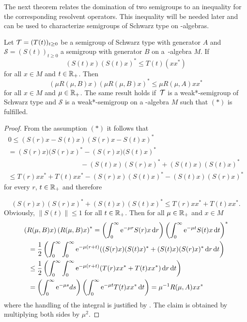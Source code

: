 The next theorem relates the domination of two semigroups to an inequality for the corresponding resolvent operators.
This inequality will be needed later and can be used to characterize semigroups of Schwarz type on \CA-algebras.
\begin{theorem}\label{thm:d1-2.1}
Let $  \TT  = (T(t))_{t\geq0} $ be a semigroup of Schwarz type with generator $ A $ and $ \mathcal{S} = (S(t))_{t\geq0} $ a semigroup with generator $ B $ on a\, \CA-algebra $ M $.
If
\begin{equation}
	(S(t)x)(S(t)x)^{*} \leq T(t)(xx^{*}) \tag{*}
\end{equation}
for all $ x \in M $ and $ t \in \mathbb{R}_{+} $.
Then  
\[
	\left( \mu R(\mu,B)x \right) \left( \mu R(\mu,B)x \right)^{*} \leq \mu R(\mu,A)xx^{*}
\]
for all $ x \in M $ and $ \mu \in \mathbb{R}_{+} $.
The same result holds if\/ $ \,\mathcal{T} $ is a weak*-semigroup of Schwarz type and $ \mathcal{S} $ is a weak*-semigroup on a \WA-algebra $ M $ such that $ (*) $ is fulfilled.
\end{theorem}
\begin{proof}
From the assumption $ (*) $ it follows that
\begin{multline*}
	0 	 \leq \left( S(r)x - S(t)x \right) \left( S(r)x - S(t)x \right)^{*} {} \\
		  = \left( S(r)x)(S(r)x \right)^{*} - \left( S(r)x)(S(t)x \right)^{*} \\
		 \phantom{(S(r)x)(S(r)x)^{*}} - (S(t)x)(S(r)x)^{*} + (S(t)x)(S(t)x)^{*}  \\
		\leq T(r)xx^{*} + T(t)xx^{*}   - (S(r)x)(S(t)x)^{*} -  
		   (S(t)x)(S(r)x)^{*}
\end{multline*}
for every $ r $, $ t \in \mathbb{R}_{+} $ and therefore

\[
	(S(r)x)(S(r)x)^{*} + (S(t)x)(S(t)x)^{*} \leq T(r)xx^{*} + T(t)xx^{*} .
\]
Obviously, $ \| S(t)\| \leq 1 $ for all $ t \in \mathbb{R}_{+} $.
Then for all $ \mu \in \mathbb{R}_{+} $ and $ x \in M $
\begin{align*}
	 {}& \left( R(\mu,B)x  \right) \left( R(\mu,B)x \right)^{*} 
		= \left( \int_{0}^\infty \eu^{-\mu r}S(r)x \dr \right)
			\left( \int_{0}^\infty \eu^{-\mu t}S(t)x \dt \right)^{*}   \\
	&\phantom{=}= \frac{1}{2} \left( \int_{0}^\infty \int_{0}^\infty \eu^{-\mu(r+t)} ((S(r)x)(S(t)x)^{*}  
			+ (S(t)x)(S(r)x)^{*}  \dr \dt \right) \\
	&\phantom{=}\leq \frac{1}{2} \left(\int_{0}^\infty \int_{0}^\infty \eu^{-\mu(r+t)} (T(r)xx^{*} + T(t)xx^{*})  			\dr \dt \right)\\
	&\phantom{=}= \left( \int_{0}^\infty \eu^{-\mu s} ds \right)
			\left( \int_{0}^\infty \eu^{-\mu t}T(t)xx^{*} \dt \right) 
				= \mu^{-1}R(\mu,A)xx^{*}
\end{align*}
where the handling of the integral is justified by \textcite[Chap. V, §8, n° 4, Proposition 9]{bourbaki:1955}.
The claim is obtained by multiplying both sides by $\mu^{2} $. 
\end{proof}
